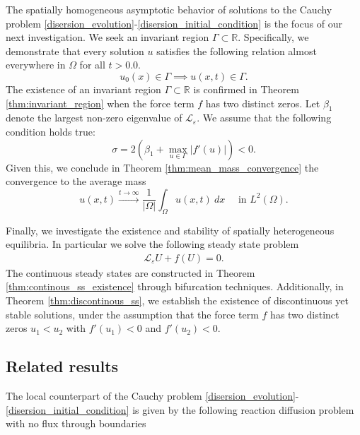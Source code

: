 \documentclass[12pt, a4paper]{article}
\theoremstyle{break}
\theoremstyle{break}
\theoremstyle{break}
\theoremstyle{break}
\theoremstyle{break}
\newcommand{\Leo}{\mathcal{L}_{\varepsilon}}
\begin{document}
\hspace{1pt}

The spatially homogeneous asymptotic behavior of solutions to the Cauchy problem \eqref{disersion_evolution}-\eqref{disersion_initial_condition} is the focus of our next investigation. We seek an invariant region $\Gamma \subset \mathbb{R}$. Specifically, we demonstrate that every solution $u$ satisfies the following relation almost everywhere in $\Omega$ for all $t > 0.0$.
\begin{equation}
    u_0(x) \in \Gamma \implies u(x, t) \in \Gamma.
    \label{invariant_region_definiton}
\end{equation}
The existence of an invariant region $\Gamma \subset \mathbb{R}$ is confirmed in Theorem \ref{thm:invariant_region} when the force term $f$ has two distinct zeros. Let $\beta_1$ denote the largest non-zero eigenvalue of $\Leo$. We assume that the following condition holds true:
\begin{equation}
    \sigma = 2\left(\beta_1 + \max_{u \in \Gamma} |f'(u)|\right) < 0.
\end{equation}
Given this, we conclude in Theorem \ref{thm:mean_mass_convergence} the convergence to the average mass 
\begin{equation}
    u(x, t) \xrightarrow{t \rightarrow \infty} \frac{1}{|\Omega|} \int_\Omega u(x, t) \:dx \quad \text{ in $L^2(\Omega)$}.
    \label{convergence_to_mean_mass}
\end{equation}

\hspace{1pt}

Finally, we investigate the existence and stability of spatially heterogeneous equilibria. In particular we solve the following steady state problem 
\begin{align}
    \Leo U + f(U) = 0.
    \label{dispersion_equilibria}
\end{align}
The continuous steady states are constructed in Theorem \ref{thm:continous_ss_existence} through bifurcation techniques. Additionally, in Theorem \ref{thm:discontinous_ss}, we establish the existence of discontinuous yet stable solutions, under the assumption that the force term $f$ has two distinct zeros $u_1 < u_2$ with $f'(u_1) < 0$ and $f'(u_2) < 0$.

\subsection{Related results}

The local counterpart of the Cauchy problem \eqref{disersion_evolution}-\eqref{disersion_initial_condition} is given by the following reaction diffusion problem with no flux through boundaries
\end{document}
